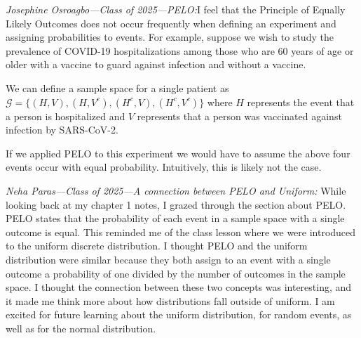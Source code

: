 \textit{Josephine Osroagbo---Class of 2025---PELO:}I feel that the Principle of Equally Likely Outcomes does not occur frequently when defining an experiment and assigning probabilities to events. For example, suppose we wish to study the prevalence of COVID-19 hospitalizations among those who are 60 years of age or older with a vaccine to guard against infection and without a vaccine. 

We can define a sample space for a single patient as $\mathcal{G} =\{(H,V), (H,V^{c}), (H^{c},V), (H^{c},V^{c})\}$ where $H$ represents the event that a person is hospitalized and $V$ represents that a person was vaccinated against infection by SARS-CoV-2. 

If we applied PELO to this experiment we would have to assume the above four events occur with equal probability. Intuitively, this is likely not the case.

\textit{Neha Paras---Class of 2025---A connection between PELO and Uniform:} While looking back at my chapter 1 notes, I grazed through the section about PELO. PELO states that the probability of each event in a sample space with a single outcome is equal. This reminded me of the class lesson where we were introduced to the uniform discrete distribution. I thought PELO and the uniform distribution were similar because they both assign to an event with a single outcome a probability of one divided by the number of outcomes in the sample space. I thought the connection between these two concepts was interesting, and it made me think more about how distributions fall outside of uniform. I am excited for future learning about the uniform distribution, for random events, as well as for the normal distribution.



